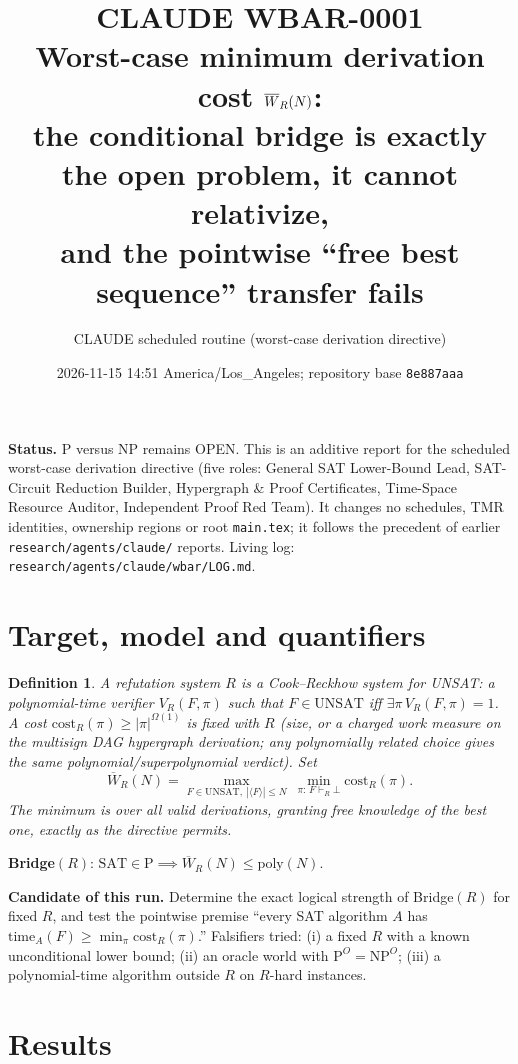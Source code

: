 \documentclass[11pt]{article}
\title{CLAUDE WBAR-0001\\[2pt]
\large Worst-case minimum derivation cost $\Wbar_R(N)$:\\
the conditional bridge is exactly the open problem, it cannot relativize,\\
and the pointwise ``free best sequence'' transfer fails}
\author{CLAUDE scheduled routine (worst-case derivation directive)}
\date{2026-11-15 14:51 America/Los\_Angeles; repository base \texttt{8e887aaa}}
\newtheorem{definition}[theorem]{Definition}
\theoremstyle{remark}
\newcommand{\SAT}{\mathrm{SAT}}
\newcommand{\UNSAT}{\mathrm{UNSAT}}
\newcommand{\Wbar}{\overline{W}}
\begin{document}
\maketitle

\noindent\textbf{Status.} P versus NP remains OPEN. This is an additive report for the
scheduled worst-case derivation directive (five roles: General SAT Lower-Bound Lead,
SAT-Circuit Reduction Builder, Hypergraph \& Proof Certificates, Time-Space Resource Auditor,
Independent Proof Red Team). It changes no schedules, TMR identities, ownership regions or
root \texttt{main.tex}; it follows the precedent of earlier \texttt{research/agents/claude/}
reports. Living log: \texttt{research/agents/claude/wbar/LOG.md}.

\section{Target, model and quantifiers}

\begin{definition}
A \emph{refutation system} $R$ is a Cook--Reckhow system for UNSAT: a polynomial-time
verifier $V_R(F,\pi)$ such that $F\in\UNSAT$ iff $\exists\pi\,V_R(F,\pi)=1$. A cost
$\mathrm{cost}_R(\pi)\ge|\pi|^{\Omega(1)}$ is fixed with $R$ (size, or a charged work measure on the
multisign DAG hypergraph derivation; any polynomially related choice gives the same
polynomial/superpolynomial verdict). Set
\[
\Wbar_R(N)=\max_{F\in\UNSAT,\ |\langle F\rangle|\le N}\ \min_{\pi:\,F\vdash_R\bot}\mathrm{cost}_R(\pi).
\]
The minimum is over all valid derivations, granting free knowledge of the best one,
exactly as the directive permits.
\end{definition}

\noindent\textbf{Bridge}$(R)$: \quad $\SAT\in\mathrm{P}\implies\Wbar_R(N)\le\mathrm{poly}(N)$.

\noindent\textbf{Candidate of this run.} Determine the exact logical strength of
Bridge$(R)$ for fixed $R$, and test the pointwise premise ``every SAT algorithm $A$ has
$\mathrm{time}_A(F)\ge\min_\pi\mathrm{cost}_R(\pi)$.''
Falsifiers tried: (i) a fixed $R$ with a known unconditional lower bound;
(ii) an oracle world with $\mathrm{P}^O=\mathrm{NP}^O$; (iii) a polynomial-time algorithm
outside $R$ on $R$-hard instances.

\section{Results}
\end{document}
